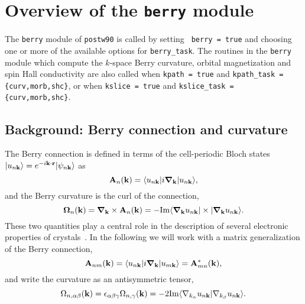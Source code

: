\chapter{Overview of the {\tt berry} module}
\label{ch:berry}

The {\tt berry} module of {\tt postw90} is called by setting {\tt
  berry = true} and choosing one or more of the available options for
{\tt berry\_task}. The routines in the {\tt berry} module which
compute the $k$-space Berry curvature, orbital magnetization and spin Hall conductivity are
also called when {\tt kpath = true} and {\tt kpath\_task = \{curv,morb,shc\}},
or when {\tt kslice = true} and {\tt kslice\_task = \{curv,morb,shc\}}.

\section{Background: Berry connection and curvature}

The Berry connection is defined in terms of the cell-periodic Bloch
states $\vert u_{n{\bf k}}\rangle=e^{-i{\bf k}\cdot{\bf r}}\vert
\psi_{n{\bf k}}\rangle$ as
%
\begin{equation}
{\bf A}_n({\bf k})=\langle u_{n{\bf k}}\vert i\bm{\nabla}_{\bf k}\vert
u_{n{\bf k}}\rangle,
\end{equation}
%
and the Berry curvature is the curl of the connection,
%
\begin{equation}
\bm{\Omega}_n({\bf k})=\bm{\nabla}_{\bf k}\times {\bf A}_n({\bf k})=
-{\rm Im}
\langle \bm{\nabla}_{\bf k} u_{n{\bf k}}\vert \times
\vert\bm{\nabla}_{\bf k} u_{n{\bf k}}\rangle.
\end{equation}
%
These two quantities play a central role in the description of several
electronic properties of crystals~\cite{xiao-rmp10}.  In the following
we will work with a matrix generalization of the Berry connection,
%
\begin{equation}
{\bf A}_{nm}({\bf k})=\langle u_{n{\bf k}}\vert i\bm{\nabla}_{\bf k}\vert
u_{m{\bf k}}\rangle={\bf A}_{mn}^*({\bf k}),
\label{eq:berry-connection-matrix}
\end{equation}
%
and write the curvature as an antisymmetric tensor,
%
\begin{equation}
\label{eq:curv}
\Omega_{n,\alpha\beta}({\bf k}) =\epsilon_{\alpha\beta\gamma}
\Omega_{n,\gamma}({\bf k})=-2{\rm Im}\langle 
\nabla_{k_\alpha} u_{n\bf k}\vert \nabla_{k_\beta} u_{n\bf k}\rangle.
\end{equation}

